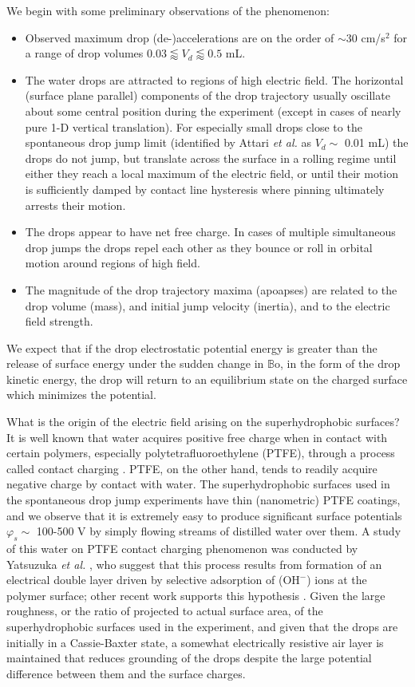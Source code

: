 \documentclass[aip,reprint, floatfix]{revtex4-1}
\begin{document}
We begin with some preliminary observations of the phenomenon:
\begin{itemize}
\item Observed maximum drop (de-)accelerations are on the order of $\sim$30 cm/s$^2$ for a range of drop volumes $0.03 \lessapprox V_d \lessapprox 0.5$ mL.
\item The water drops are attracted to regions of high electric field. The horizontal (surface plane parallel) components of the drop trajectory usually oscillate about some central position during the experiment (except in cases of nearly pure 1-D vertical translation). For especially small drops close to the spontaneous drop jump limit (identified by Attari \emph{et al.} \citep{attari_puddle_2016} as $V_d \sim$ 0.01 mL) the drops do not jump, but translate across the surface in a rolling regime until either they reach a local maximum of the electric field, or until their motion is sufficiently damped by contact line hysteresis where pinning ultimately arrests their motion.
\item The drops appear to have net free charge. In cases of multiple simultaneous drop jumps the drops repel each other as they bounce or roll in orbital motion around regions of high field.
\item The magnitude of the drop trajectory maxima (apoapses) are related to the drop volume (mass), and initial jump velocity (inertia), and to the electric field strength.
\end{itemize}

We expect that if the drop electrostatic potential energy is greater than the release of surface energy under the sudden change in $\mathbb{B}\mbox{o}$, in the form of the drop kinetic energy, the drop will return to an equilibrium state on the charged surface which minimizes the potential.

What is the origin of the electric field arising on the superhydrophobic surfaces? It is well known that water acquires positive free charge when in contact with certain polymers, especially polytetrafluoroethylene (PTFE), through a process called contact charging \cite{langmuir_surface_1938}. PTFE, on the other hand, tends to readily acquire negative charge by contact with water. The superhydrophobic surfaces used in the spontaneous drop jump experiments have thin (nanometric) PTFE coatings, and we observe that it is extremely easy to produce significant surface potentials $\varphi_s \sim$ 100-500 V by simply flowing streams of distilled water over them. A study of this water on PTFE contact charging phenomenon was conducted by Yatsuzuka \emph{et al.} \cite{yatsuzuka_electrification_1994}, who suggest that this process results from formation of an electrical double layer driven by selective adsorption of ($\mbox{OH}^-$) ions at the polymer surface; other recent work supports this hypothesis \cite{beattie_intrinsic_2006, strazdaite_water_2015}. Given the large roughness, or the ratio of projected to actual surface area, of the superhydrophobic surfaces used in the experiment, and given that the drops are initially in a Cassie-Baxter state, a somewhat electrically resistive air layer is maintained that reduces grounding of the drops despite the large potential difference between them and the surface charges.
\end{document}
